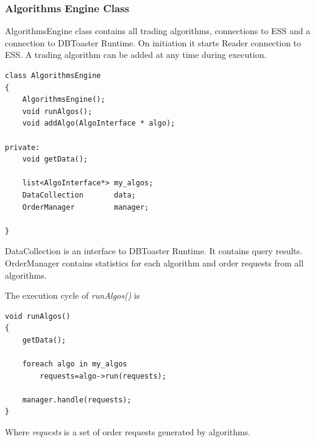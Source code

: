\documentclass[14pt]{article}
\begin{document}


\subsubsection{Algorithms Engine Class}

AlgorithmsEngine class contains all trading algorithms, connections to ESS and a connection to DBToaster Runtime. On initiation it starts Reader connection to ESS. A trading algorithm can be added at any time during execution. 

\begin{verbatim}
class AlgorithmsEngine
{
    AlgorithmsEngine();
    void runAlgos();
    void addAlgo(AlgoInterface * algo);

private:
    void getData();
    
    list<AlgoInterface*> my_algos;
    DataCollection       data;
    OrderManager         manager;
	
}
\end{verbatim}

DataCollection is an interface to DBToaster Runtime. It contains query results. OrderManager contains statistics for each algorithm and order requests from all algorithms. 

The execution cycle of \emph{runAlgos()} is

\begin{verbatim}
void runAlgos()
{
    getData();
    
    foreach algo in my_algos
        requests=algo->run(requests);
    
    manager.handle(requests);
}
\end{verbatim}

Where \emph{requests} is a set of order requests generated by algorithms.

\end{document}
